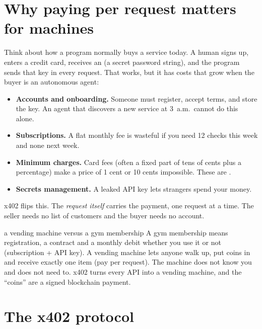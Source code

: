 \section{Why paying per request matters for machines}
Think about how a program normally buys a service today. A human signs up, enters a credit card, receives an  (a secret password string), and the program sends that key in every request. That works, but it has costs that grow when the buyer is an autonomous agent:
\begin{itemize}
  \item \textbf{Accounts and onboarding.} Someone must register, accept terms, and store the key. An agent that discovers a new service at 3~a.m.\ cannot do this alone.
  \item \textbf{Subscriptions.} A flat monthly fee is wasteful if you need 12 checks this week and none next week.
  \item \textbf{Minimum charges.} Card fees (often a fixed part of tens of cents plus a percentage) make a price of 1 cent or 10 cents impossible. These are .
  \item \textbf{Secrets management.} A leaked API key lets strangers spend your money.
\end{itemize}

x402 flips this. The \emph{request itself} carries the payment, one request at a time. The seller needs no list of customers and the buyer needs no account.

\begin{analogybox}{a vending machine versus a gym membership}
A gym membership means registration, a contract and a monthly debit whether you use it or not (subscription + API key). A vending machine lets anyone walk up, put coins in and receive exactly one item (pay per request). The machine does not know you and does not need to. x402 turns every API into a vending machine, and the ``coins'' are a signed blockchain payment.
\end{analogybox}

\section{The x402 protocol}
